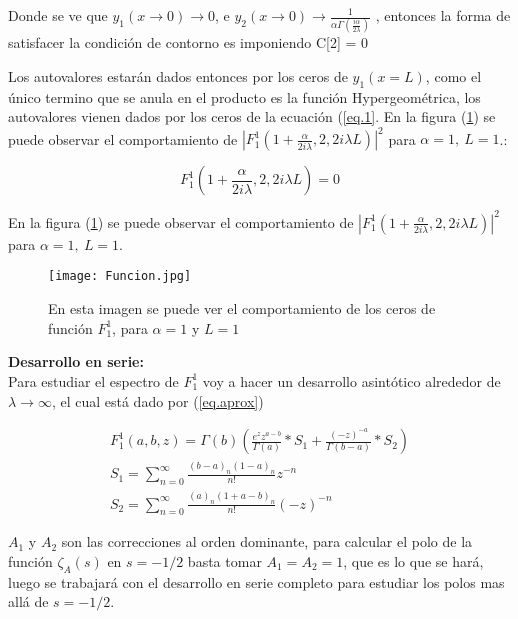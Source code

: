 Donde se ve que $y _1 (x \rightarrow 0 ) \rightarrow 0$, e $y _2 (x \rightarrow 0)  \rightarrow
\frac{1}{  \alpha   \Gamma ( \frac{i \alpha}{2 \lambda}  )   } $ , entonces la forma de satisfacer la condición de contorno es imponiendo C[2] = 0

Los autovalores estarán dados entonces por los ceros de $y_1 (x= L)$, como el único termino que se anula en el producto es la función Hypergeométrica, los autovalores vienen dados por los ceros de la ecuación (\ref{eq.1}. En la figura (\ref{fig:funcion}) se puede observar el comportamiento  de $ | F _1 ^1 (1+\frac{ \alpha}{2 i \lambda},2,2 i \lambda L) | ^2 $ para   $\alpha=1, \ L=1$.:


\begin{equation}
F _1 ^1 (1+\frac{ \alpha}{2 i \lambda},2,2 i \lambda L)  = 0
\label{eq.1}
\end{equation}

En la figura (\ref{fig:funcion}) se puede observar el comportamiento  de $ | F _1 ^1 (1+\frac{ \alpha}{2 i \lambda},2,2 i \lambda L) | ^2 $ para   $\alpha=1, \ L=1$. \\

\begin{figure}[h!]
\centering
\texttt{[image: Funcion.jpg]}
\caption{En esta imagen se puede ver el comportamiento de los ceros de función $F _1 ^1$, para $\alpha=1$ y $L=1$}
\label{fig:funcion}
\end{figure}

\textbf{Desarrollo en serie:} \\

Para estudiar el espectro de $F _1 ^1$ voy a hacer un desarrollo asintótico alrededor de $\lambda \rightarrow \infty$, el cual está dado por (\ref{eq.aprox})


\begin{equation}
\begin{array}{c}
    F _1 ^1 (a,b,z) = \Gamma (b) 
    \left(
    \frac{e^z z ^{a-b} }{\Gamma(a)} * S_1 + \frac{(-z) ^{ -a}}{ \Gamma(b-a)} 
    * S_2
    \right) \\ 
    S _1 = \sum _{n=0} ^{\infty} \frac{(b-a) _n (1-a) _n}{n!} z ^{-n} \\ 
    S _2 = \sum _{n=0} ^{\infty} \frac{(a) _n (1+a-b) _n}{n!} (-z) ^{-n}
    
\end{array}
\label{eq.aprox}
\end{equation}

$A_1$ y $A _2$ son las correcciones al orden dominante, para calcular el polo de la función $\zeta _A (s)$ en $s=-1/2$ basta tomar $A _1 = A _2 = 1$, que es lo que se hará, luego se trabajará con el desarrollo en serie completo para estudiar los polos mas allá de $s=-1/2$. 

